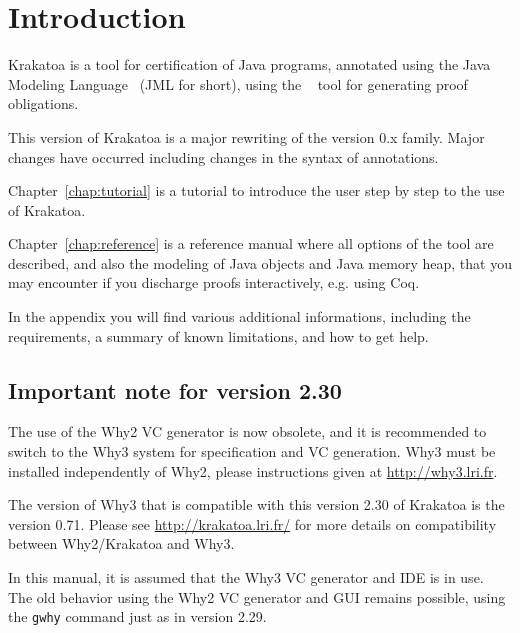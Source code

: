 \documentclass[a4paper,11pt,twoside,openright]{report}
\begin{document}
\sloppy
{}



\tableofcontents

\chapter{Introduction}

Krakatoa is a tool for certification of Java programs, annotated using
the Java Modeling Language~\cite{leavens00preliminary} (JML for
short), using the \Why{}~\cite{why} tool for generating proof
obligations.

This version \whyversion{} of Krakatoa is a major rewriting of
the version 0.x family. Major changes have occurred including changes in the syntax of annotations.

Chapter~\ref{chap:tutorial} is a tutorial to introduce the user step
by step to the use of Krakatoa.

Chapter~\ref{chap:reference} is a reference manual where all options
of the tool are described, and also the modeling of Java objects and
Java memory heap, that you may encounter if you discharge proofs
interactively, e.g. using Coq.

In the appendix you will find various additional informations,
including the requirements, a summary of known limitations, and how to
get help.

\section{Important note for version 2.30}

The use of the Why2 VC generator is now obsolete, and it is
recommended to switch to the Why3 system for specification and VC
generation. Why3 must be installed independently of Why2, please
instructions given at \url{http://why3.lri.fr}.

The version of Why3 that is compatible with this version 2.30 of Krakatoa
is the version 0.71. Please see \url{http://krakatoa.lri.fr/} for more
details on compatibility between Why2/Krakatoa and Why3.

In this manual, it is assumed that the Why3 VC generator and IDE is in
use.  The old behavior using the Why2 VC generator and GUI remains
possible, using the \texttt{gwhy} command just as in version 2.29.
\end{document}
